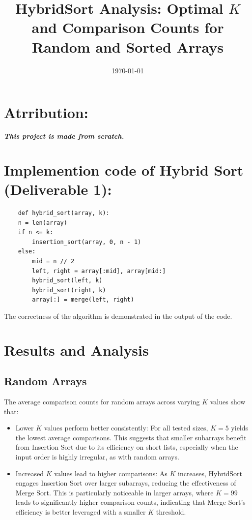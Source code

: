 \documentclass{article}
\title{HybridSort Analysis: Optimal \( K \) and Comparison Counts for Random and Sorted Arrays}
\author{}
\date{\today}
\begin{document}
\maketitle

\section{Atrribution: }
\textbf{\textit{This project is made from scratch.}}

\section{Implemention code of Hybrid Sort (Deliverable 1): }
\begin{verbatim}
    def hybrid_sort(array, k):
    n = len(array)
    if n <= k:
        insertion_sort(array, 0, n - 1)
    else:
        mid = n // 2
        left, right = array[:mid], array[mid:]
        hybrid_sort(left, k)
        hybrid_sort(right, k)
        array[:] = merge(left, right)
\end{verbatim}

The correctness of the algorithm is demonstrated in the output of the code. 
\section{Results and Analysis}

\subsection{Random Arrays}
The average comparison counts for random arrays across varying \( K \) values show that:
\begin{itemize}
    \item Lower \( K \) values perform better consistently: For all tested sizes, \( K = 5 \) yields the lowest average comparisons. This suggests that smaller subarrays benefit from Insertion Sort due to its efficiency on short lists, especially when the input order is highly irregular, as with random arrays.
    \item Increased \( K \) values lead to higher comparisons: As \( K \) increases, HybridSort engages Insertion Sort over larger subarrays, reducing the effectiveness of Merge Sort. This is particularly noticeable in larger arrays, where \( K = 99 \) leads to significantly higher comparison counts, indicating that Merge Sort’s efficiency is better leveraged with a smaller \( K \) threshold.
\end{itemize}
\end{document}
